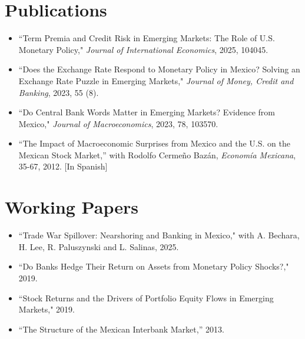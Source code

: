 \documentclass[12pt]{article}
\newcommand{\vsect}{\vspace{0.08cm}}
\begin{document}
	
	\section{Publications} 
	\vsect
	\begin{itemize}[label={},itemindent=-2em,leftmargin=2em,noitemsep,topsep=0pt]
		\item ``Term Premia and Credit Risk in Emerging Markets: The Role of U.S. Monetary Policy," \textit{Journal of International Economics}, 2025, 104045.
		\item ``Does the Exchange Rate Respond to Monetary Policy in Mexico? Solving an Exchange Rate Puzzle in Emerging Markets," \textit{Journal of Money, Credit and Banking}, 2023, 55 (8). %
		\item ``Do Central Bank Words Matter in Emerging Markets? Evidence from Mexico," \textit{Journal of Macroeconomics}, 2023, 78, 103570.
		\item ``The Impact of Macroeconomic Surprises from Mexico and the U.S. on the Mexican Stock Market,” with Rodolfo Cermeño Bazán, \textit{Economía Mexicana}, 35-67, 2012. [In Spanish]
	\end{itemize}
	
	
	\section{Working Papers}
	\vsect
	\begin{itemize}[label={},itemindent=-2em,leftmargin=2em,noitemsep,topsep=0pt]
	\item ``Trade War Spillover: Nearshoring and Banking in Mexico," with A. Bechara, H. Lee, R. Paluszynski and L. Salinas, 2025.
	\item ``Do Banks Hedge Their Return on Assets from Monetary Policy Shocks?," 2019.
	\item ``Stock Returns and the Drivers of Portfolio Equity Flows in Emerging Markets," 2019.
	\item ``The Structure of the Mexican Interbank Market,” 2013.
	\end{itemize}
	
	\pagestyle{fancy}
	
\end{document}

